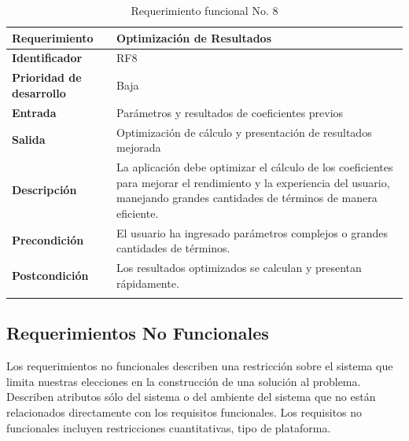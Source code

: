 \begin{longtable}{|m{3.5cm}|m{9.5cm}|}
	\hline
	\rowcolor{black!75} \color{white}\textbf{Requerimiento} & \color{white}\textbf{Optimización de Resultados} \\
	\hline
	\textbf{Identificador} & RF8 \\
	\hline
	\textbf{Prioridad de desarrollo} & Baja \\
	\hline
	\textbf{Entrada} & Parámetros y resultados de coeficientes previos \\
	\hline
	\textbf{Salida} & Optimización de cálculo y presentación de resultados mejorada \\
	\hline
	\textbf{Descripción} & La aplicación debe optimizar el cálculo de los coeficientes para mejorar el rendimiento y la experiencia del usuario, manejando grandes cantidades de términos de manera eficiente. \\
	\hline
	\textbf{Precondición} & El usuario ha ingresado parámetros complejos o grandes cantidades de términos. \\
	\hline
	\textbf{Postcondición} & Los resultados optimizados se calculan y presentan rápidamente. \\
	\hline
	\rowcolor{white} \caption{Requerimiento funcional No. 8} \label{tabla:RF8} \\
\end{longtable}


\subsection{Requerimientos No Funcionales}
Los requerimientos no funcionales describen una restricción sobre el sistema que limita nuestras elecciones en la construcción de una solución al problema. Describen atributos sólo del sistema o del ambiente del sistema que no están relacionados directamente con los requisitos funcionales. Los requisitos no funcionales incluyen restricciones cuantitativas, tipo de plataforma.

